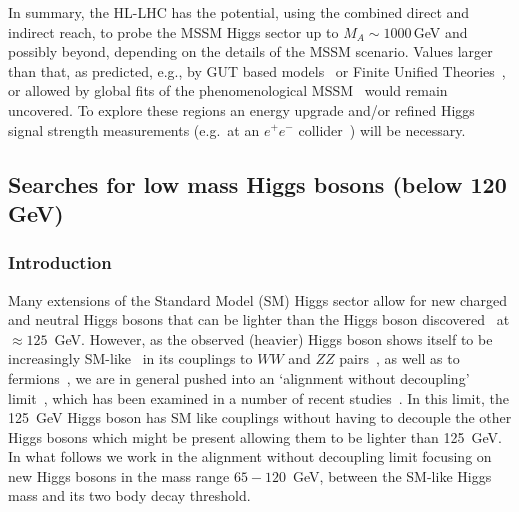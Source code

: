 \documentclass[../report.tex]{subfiles}
\begin{document}
In summary, the HL-LHC has the potential, using the combined direct and indirect reach, to probe the MSSM Higgs sector up to $M_A \sim 1000$\,GeV and possibly beyond, depending on the details of the MSSM scenario. Values larger than that, as predicted, e.g., by GUT based models~\cite{Buchmueller:2013rsa,Buchmueller:2014yva,Bechtle:2015nua,Bagnaschi:2016afc,Bagnaschi:2016xfg,Costa:2017gup} or Finite Unified Theories~\cite{Heinemeyer:2013nza,Heinemeyer:2018roq,Heinemeyer:2018zpw}, or allowed by global fits of the phenomenological MSSM~\cite{Bechtle:2016kui,Bagnaschi:2017tru} would remain uncovered. To explore these regions an energy upgrade and/or refined Higgs signal strength measurements (e.g.\ at an $e^+e^-$ collider~\cite{Moortgat-Picka:2015yla}) will be
necessary.  




\subsection{Searches for low mass Higgs bosons (below 120 GeV)}


\subsubsection{Introduction}\label{sec:intro}

Many extensions of the Standard Model (SM) Higgs sector allow for new
charged and neutral Higgs bosons that can be lighter than the Higgs
boson discovered~\cite{Aad:2012tfa,Chatrchyan:2012xdj} at $\approx 125$~GeV. 
However, as the observed (heavier) Higgs boson shows itself to be 
increasingly SM-like~\cite{Falkowski:2013dza} in its couplings to $WW$
and $ZZ$ pairs~\cite{Khachatryan:2014kca,Khachatryan:2016vau,Sirunyan:2017exp,Sirunyan:2017tqd,Aaboud:2017oem,Falkowski:2013dza},
as well as to fermions~\cite{Aaboud:2018zhk,CMS:2018abb}, we are in
general pushed into an `alignment without decoupling'
limit~\cite{Gunion:2002zf,Carena:2013ooa}, which has been examined in a
number of recent
studies~\cite{Craig:2013hca,Carena:2014nza,Carena:2015moc,Bernon:2015wef,Profumo:2016zxo,Bechtle:2016kui,Haber:2017erd,Bahl:2018zmf}. In
this limit, the 125~GeV Higgs boson has SM like couplings without having
to decouple the other Higgs bosons which might be present allowing them
to be lighter than 125~GeV. In what follows we work in the alignment
without decoupling limit focusing on new Higgs bosons in the mass range
$65 - 120$~GeV, between the SM-like Higgs mass and its two body decay
threshold. 
\end{document}
